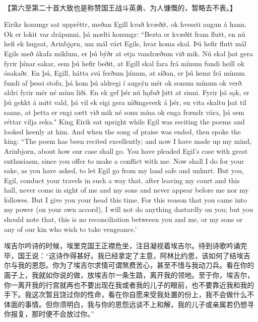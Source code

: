 \hspace*{\fill}\\
【第六至第二十首大致也是称赞国王战斗英勇、为人慷慨的，暂略去不表。】
\hspace*{\fill}\\
\begin{paracol}{2}
    Eiríkr konungr sat uppréttr, meðan Egill kvað kvæðit, ok hvessti augun á hann. Ok er lokit var drápunni, þá mælti konungr: ``Bezta er kvæðit fram flutt, en nú hefi ek hugsat, Arinbjǫrn, um mál várt Egils, hvar koma skal. Þú hefir flutt mál Egils með ákafa miklum, er þú býðr at etja vandræðum við mik. Nú skal þat gera fyrir þínar sakar, sem þú hefir beðit, at Egill skal fara frá mínum fundi heill ok ósakaðr. En þú, Egill, hátta svá ferðum þínum, at síðan, er þú kemr frá mínum fundi af þessi stofu, þá kom þú aldregi í augsýn mér ok sonum mínum ok verð aldri fyrir mér né mínu liði. En ek gef þér nú hǫfuð þitt at sinni. Fyrir þá sǫk, er þú gekkt á mitt vald, þá vil ek eigi gera níðingsverk á þér, en vita skaltu þat til sanns, at þetta er engi sætt við mik né sonu mína ok enga frændr vára, þá sem réttar vilja reka."
    \switchcolumn
    King Eirik sat upright while Egil was reciting the poems and looked keenly at him. And when the song of praise was ended, then spoke the king: ``The poem has been recited excellently; and now I have made up my mind, Arinbjorn, about how our case shall go. You have pleaded Egil's case with great enthusiasm, since you offer to make a conflict with me. Now shall I do for your sake, as you have asked, to let Egil go from my land safe and unhurt. But you, Egil, conduct your travels in such a way that, after leaving my court and this hall, never come in sight of me and my sons and never appear before me nor my followes. But I give you your head this time. For this reason that you came into my power (on your own accord), I will not do anything dastardly on you; but you should note that, this is no reconciliation betweeen you and me, or my sons or any of our kin who wish to take vengeance.'
\end{paracol}
\begin{translation*}{}
    埃吉尔吟诗的时候，埃里克国王正襟危坐，注目凝视着埃吉尔。待到诗歌吟诵完毕，国王说：“这诗作得甚好。我已经拿定了主意，阿林比约恩，该如何了结埃吉尔与我的恩怨。你为了埃吉尔求情可谓煞费苦心，甚至不惜与我动刀兵。看在你的面子上，我就如你说的做，放埃吉尔一条生路，离开我的领地。至于你，埃吉尔，你一离开我的行宫就再也不要出现在我或者我的儿子的眼前，也不要靠近我和我的手下。我这次暂且饶过你的性命，看在你自愿来受我处置的份上，我不会做什么不体面的事情。但你须明白，我与你的恩怨远谈不上和解，我的儿子或亲属若仍想寻你报复，那时便不会放过你。”
\end{translation*}

